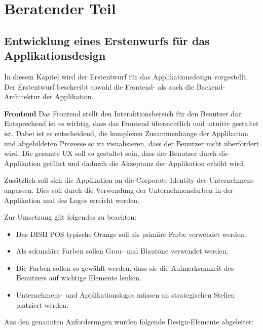 \newpage
\section{Beratender Teil} \label{sec:beratender-teil}

\subsection{Entwicklung eines Erstenwurfs für das Applikationsdesign}\label{subsec:entwicklung-eines-erstenwurfs-fuer-das-applikationsdesign}
In diesem Kapitel wird der Erstentwurf für das Applikationsdesign vorgestellt.
Der Erstentwurf beschreibt sowohl die Frontend- als auch die Backend-Architektur der Applikation.

\textbf{Frontend}\newline
Das Frontend stellt den Interaktionsbereich für den Benutzer dar.
Entsprechend ist es wichtig, dass das Frontend übersichtlich und intuitiv gestaltet ist.
Dabei ist es entscheidend, die komplexen Zusammenhänge der Applikation und abgebildeten Prozesse so zu visualisieren, dass der Benutzer nicht überfordert wird.
Die gesamte \ac{UX} soll so gestaltet sein, dass der Benutzer durch die Applikation geführt und dadurch die Akzeptanz der Applikation erhöht wird.

Zusätzlich soll sich die Applikation an die Corporate Identity des Unternehmens anpassen.
Dies soll durch die Verwendung der Unternehmensfarben in der Applikation und des Logos erreicht werden.

Zur Umsetzung gilt folgendes zu beachten:
\begin{itemize}
    \item Das DISH POS typische Orange soll als primäre Farbe verwendet werden.
    \item Als sekundäre Farben sollen Grau- und Blautöne verwendet werden.
    \item Die Farben sollen so gewählt werden, dass sie die Aufmerksamkeit des Benutzers auf wichtige Elemente lenken.
    \item Unternehmens- und Applikationslogos müssen an strategischen Stellen platziert werden.
\end{itemize}
\newpage

Aus den genannten Anforderungen wurden folgende Design-Elemente abgeleitet:

